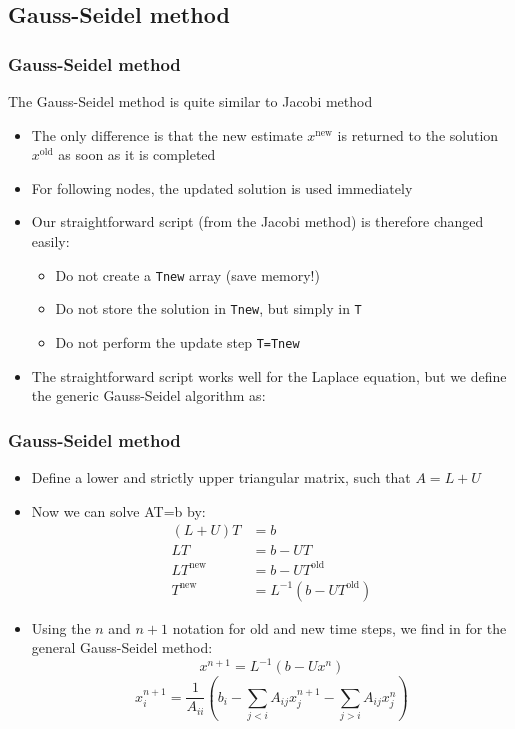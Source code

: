 \documentclass[11pt,table,final,xcolor={usenames,dvipsnames,table}]{beamer}
\begin{document}
\subsection*{Gauss-Seidel method}
\begin{frame}[fragile]
  \frametitle{Gauss-Seidel method}
  The Gauss-Seidel method is quite similar to Jacobi method
  \begin{itemize}
   \item The only difference is that the new estimate $x^\text{new}$ is returned to the solution $x^\text{old}$ as soon as it is completed
   \item For following nodes, the updated solution is used immediately
   \item Our straightforward script (from the Jacobi method) is therefore changed easily:
   \begin{itemize}
    \item Do not create a \lstinline$Tnew$ array (save memory!)
    \item Do not store the solution in \lstinline$Tnew$, but simply in \lstinline$T$
    \item Do not perform the update step \lstinline$T=Tnew$
   \end{itemize}
   \item The straightforward script works well for the Laplace equation, but we define the generic Gauss-Seidel algorithm as:
  \end{itemize}
\end{frame}

\begin{frame}[fragile]
  \frametitle{Gauss-Seidel method}
  \begin{itemize}
    \item Define a lower and strictly upper triangular matrix, such that $A = L + U$
    \item Now we can solve AT=b by:
    \begin{align*}
      (L+U)T &= b \\
      LT &= b - UT \\
      LT^\text{new} &= b - UT^\text{old} \\
      T^\text{new} &= L^{-1}(b-UT^\text{old})
   \end{align*}
     \item Using the $n$ and $n+1$ notation for old and new time steps, we find in for the general Gauss-Seidel method:
     \[
      x^{n+1} = L^{-1}\left(b-Ux^n\right)
     \]
     \[
      x_i^{n+1} = \frac{1}{A_{ii}}\left(b_i - \sum_{j<i} A_{ij}x_j^{n+1}- \sum_{j>i} A_{ij}x_j^n\right)
     \]
  \end{itemize}
\end{frame}
\end{document}

